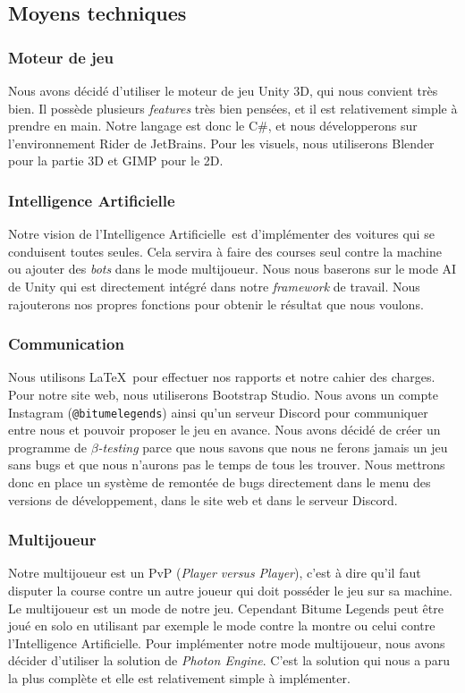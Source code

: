 \documentclass[12pt,a4paper]{article}
\newcommand{\AI}{Intelligence Artificielle}
\begin{document}
\subsection{Moyens techniques}
\subsubsection{Moteur de jeu}
Nous avons décidé d'utiliser le moteur de jeu Unity 3D, qui nous convient très bien. Il possède plusieurs 
\textit{features} très bien pensées, et il est relativement simple à prendre en main. Notre langage est 
donc le C\#, et nous développerons sur l'environnement Rider de JetBrains. Pour les visuels, nous
utiliserons Blender pour la partie 3D et GIMP pour le 2D.
\subsubsection{\AI}
Notre vision de l'\AI\, est d'implémenter des voitures qui se conduisent toutes seules.
Cela servira à faire des courses seul contre la machine ou ajouter des \textit{bots} dans le mode 
multijoueur. Nous nous baserons sur le mode AI de Unity qui est directement intégré
dans notre \textit{framework} de travail. Nous rajouterons nos propres fonctions pour obtenir
le résultat que nous voulons.
\subsubsection{Communication}
Nous utilisons \LaTeX\, pour effectuer nos rapports et notre cahier des charges. Pour notre site web, 
nous utiliserons Bootstrap Studio. Nous avons un compte Instagram (\texttt{@bitumelegends}) 
ainsi qu'un serveur Discord pour communiquer entre nous et pouvoir proposer le jeu en avance.
Nous avons décidé de créer un programme de \(\beta\)\textit{-testing} parce que nous savons que nous 
ne ferons jamais un jeu sans bugs et que nous n'aurons pas le temps de tous les trouver. Nous mettrons
donc en place un système de remontée de bugs directement dans le menu des versions de développement, 
dans le site web et dans le serveur Discord.
\subsubsection{Multijoueur}
Notre multijoueur est un PvP (\textit{Player versus Player}), c'est à dire qu'il faut disputer la course 
contre un autre joueur qui doit posséder le jeu sur sa machine. Le multijoueur est un mode de notre jeu. 
Cependant Bitume Legends peut être joué en solo en utilisant par exemple le mode contre la montre ou 
celui contre l'Intelligence Artificielle. Pour implémenter notre mode multijoueur, nous avons décider 
d'utiliser la solution de \emph{Photon Engine}. C'est la solution qui nous a paru la plus complète et 
elle est relativement simple à implémenter.
\end{document}
